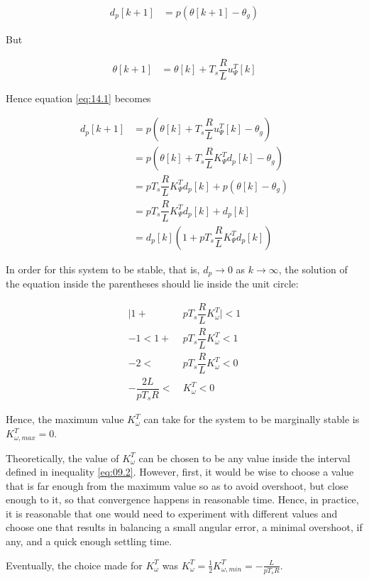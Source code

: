 \begin{align}
  d_p[k+1] &= p (\theta[k+1] - \theta_g) \label{eq:14.1}
\end{align}

But

\begin{align*}
  \theta[k+1] &= \theta[k] + T_s \dfrac{R}{L} u_{\Psi}^T[k]
\end{align*}

Hence equation \ref{eq:14.1} becomes

\begin{align*}
  d_p[k+1] &= p (\theta[k] + T_s \dfrac{R}{L} u_{\Psi}^T[k] - \theta_g) \\
           &= p(\theta[k] + T_s \dfrac{R}{L} K_{\Psi}^T d_p[k] - \theta_g)  \\
           &= p T_s \dfrac{R}{L} K_{\Psi}^T d_p[k] + p (\theta[k] - \theta_g) \\
           &= p T_s \dfrac{R}{L} K_{\Psi}^T d_p[k] + d_p[k] \\
           &= d_p[k] (1 + p T_s \dfrac{R}{L} K_{\Psi}^T d_p[k])
\end{align*}

In order for this system to be stable, that is, $d_p \to 0$ as $k \to \infty$,
the solution of the equation inside the parentheses should lie inside the unit
circle:

\begin{align}
  \Big|1 + &p T_s \dfrac{R}{L} K_{\omega}^T\Big| < 1 \nonumber \\
  -1 < 1 + &p T_s \dfrac{R}{L} K_{\omega}^T < 1 \nonumber \\
  -2 < &p T_s \dfrac{R}{L} K_{\omega}^T < 0 \nonumber \\
  -\dfrac{2L}{p T_s R} <\ &K_{\omega}^T < 0 \label{eq:14.2}
\end{align}

Hence, the maximum value $K_{\omega}^T$ can take for the system to be marginally
stable is $K_{\omega,max}^T = 0$.

Theoretically, the value of $K_{\omega}^T$ can be chosen to be any value inside
the interval defined in inequality \ref{eq:09.2}. However, first, it would be
wise to choose a value that is far enough from the maximum value so as to avoid
overshoot, but close enough to it, so that convergence happens in reasonable
time. Hence, in practice, it is reasonable that one would need to experiment
with different values and choose one that results in balancing a small angular
error, a minimal overshoot, if any, and a quick enough settling time.

Eventually, the choice made for $K_{\omega}^T$ was
$K_{\omega}^T = \frac{1}{2} K_{\omega,min}^T = -\frac{L}{p T_s R}$.
